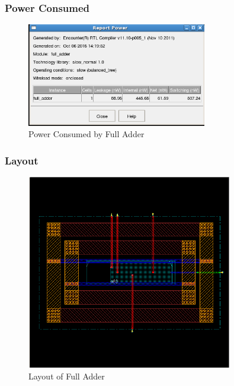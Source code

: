 \subsubsection*{Power Consumed}
\FloatBarrier
\begin{figure}[!htpb]
\centering
\includegraphics[width=0.7\textwidth]{images/power.png}
\caption{Power Consumed by Full Adder}
\end{figure}

\subsubsection*{Layout}
\FloatBarrier
\begin{figure}[!htpb]
\centering
\includegraphics[width=0.8\textwidth]{images/layout.png}
\caption{Layout of Full Adder}
\end{figure}

